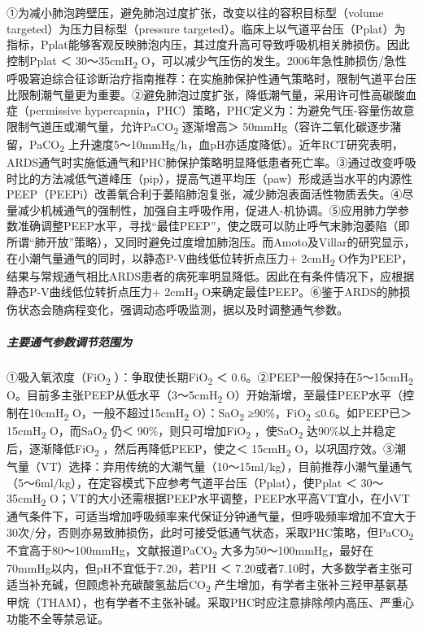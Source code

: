①为减小肺泡跨壁压，避免肺泡过度扩张，改变以往的容积目标型（volume
targeted）为压力目标型（pressure
targeted）。临床上以气道平台压（Pplat）为指标，Pplat能够客观反映肺泡内压，其过度升高可导致呼吸机相关肺损伤。因此控制Pplat
＜ 30～35cmH\textsubscript{2}
O，可以减少气压伤的发生。2006年急性肺损伤/急性呼吸窘迫综合征诊断治疗指南推荐：在实施肺保护性通气策略时，限制气道平台压比限制潮气量更为重要。②避免肺泡过度扩张，降低潮气量，采用许可性高碳酸血症（permissive
hypercapnia，PHC）策略，PHC定义为：为避免气压-容量伤故意限制气道压或潮气量，允许PaCO\textsubscript{2}
逐渐增高＞ 50mmHg（容许二氧化碳逐步潴留，PaCO\textsubscript{2}
上升速度5～10mmHg/h，血pH亦适度降低）。近年RCT研究表明，ARDS通气时实施低通气和PHC肺保护策略明显降低患者死亡率。③通过改变呼吸时比的方法减低气道峰压（pip），提高气道平均压（paw）形成适当水平的内源性PEEP（PEEPi）改善氧合利于萎陷肺泡复张，减少肺泡表面活性物质丢失。④尽量减少机械通气的强制性，加强自主呼吸作用，促进人-机协调。⑤应用肺力学参数准确调整PEEP水平，寻找“最佳PEEP”，使之既可以防止呼气末肺泡萎陷（即所谓“肺开放”策略），又同时避免过度增加肺泡压。而Amoto及Villar的研究显示，在小潮气量通气的同时，以静态P-V曲线低位转折点压力+
2cmH\textsubscript{2}
O作为PEEP，结果与常规通气相比ARDS患者的病死率明显降低。因此在有条件情况下，应根据静态P-V曲线低位转折点压力+
2cmH\textsubscript{2}
O来确定最佳PEEP。⑥鉴于ARDS的肺损伤状态会随病程变化，强调动态呼吸监测，据以及时调整通气参数。

\subparagraph{主要通气参数调节范围为}

①吸入氧浓度（FiO\textsubscript{2} ）：争取使长期FiO\textsubscript{2} ＜
0.6。②PEEP一般保持在5～15cmH\textsubscript{2}
O。目前多主张PEEP从低水平（3～5cmH\textsubscript{2}
O）开始渐增，至最佳PEEP水平（控制在10cmH\textsubscript{2}
O，一般不超过15cmH\textsubscript{2} O）：SaO\textsubscript{2}
≥90\%，FiO\textsubscript{2} ≤0.6。如PEEP已＞ 15cmH\textsubscript{2}
O，而SaO\textsubscript{2} 仍＜ 90\%，则只可增加FiO\textsubscript{2}
，使SaO\textsubscript{2}
达90\%以上并稳定后，逐渐降低FiO\textsubscript{2}
，然后再降低PEEP，使之＜ 15cmH\textsubscript{2}
O，以巩固疗效。③潮气量（VT）选择：弃用传统的大潮气量（10～15ml/kg），目前推荐小潮气量通气（5～6ml/kg），在定容模式下应参考气道平台压（Pplat），使Pplat
＜ 30～35cmH\textsubscript{2}
O；VT的大小还需根据PEEP水平调整，PEEP水平高VT宜小，在小VT通气条件下，可适当增加呼吸频率来代保证分钟通气量，但呼吸频率增加不宜大于30次/分，否则亦易致肺损伤，此时可接受低通气状态，采取PHC策略，但PaCO\textsubscript{2}
不宜高于80～100mmHg，文献报道PaCO\textsubscript{2}
大多为50～100mmHg，最好在70mmHg以内，但pH不宜低于7.20，若PH ＜
7.20或者7.10时，大多数学者主张可适当补充碱，但顾虑补充碳酸氢盐后CO\textsubscript{2}
产生增加，有学者主张补三羟甲基氨基甲烷（THAM），也有学者不主张补碱。采取PHC时应注意排除颅内高压、严重心功能不全等禁忌证。

